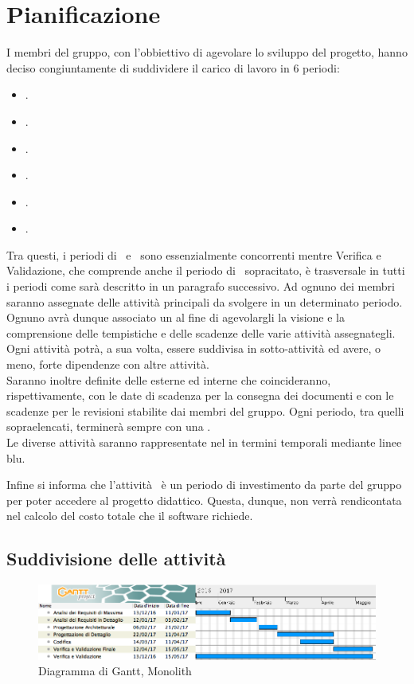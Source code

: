 \newpage
\section{Pianificazione}
I membri del gruppo, con l'obbiettivo di agevolare lo sviluppo del progetto, hanno deciso congiuntamente di suddividere il carico di lavoro in 6 periodi:
\begin{itemize}
	\item \ARM.
	\item \ARD.
	\item \PA.
	\item \PD.
	\item \COD.
	\item \VV.
\end{itemize}
Tra questi, i periodi di \PD\ e \COD\ sono essenzialmente concorrenti mentre Verifica e Validazione, che comprende anche il periodo di \VV\ sopracitato, è trasversale in tutti i periodi come sarà descritto in un paragrafo successivo.
Ad ognuno dei membri saranno assegnate delle attività principali da svolgere in un determinato periodo. Ognuno avrà dunque associato un  al fine di agevolargli la visione e la comprensione delle tempistiche e delle scadenze delle varie attività assegnategli.
Ogni attività potrà, a sua volta, essere suddivisa in sotto-attività ed avere, o meno, forte dipendenze con altre attività.\\
Saranno inoltre definite delle  esterne ed interne che coincideranno, rispettivamente, con le date di scadenza per la consegna dei documenti e con le scadenze per le revisioni stabilite dai membri del gruppo.
Ogni periodo, tra quelli sopraelencati, terminerà sempre con una .\\

Le diverse attività saranno rappresentate nel  in termini temporali mediante linee blu.

Infine si informa che l'attività \ARM\ è un periodo di investimento da parte del gruppo per poter accedere al progetto didattico. Questa, dunque, non verrà rendicontata nel calcolo del costo totale che il software richiede.

\subsection{Suddivisione delle attività}

 \begin{figure}[H]
	\centering 
	\includegraphics[scale=0.5]{Immagini/Gantt/TOT.png}
	\caption{Diagramma di Gantt, Monolith}
\end{figure}

